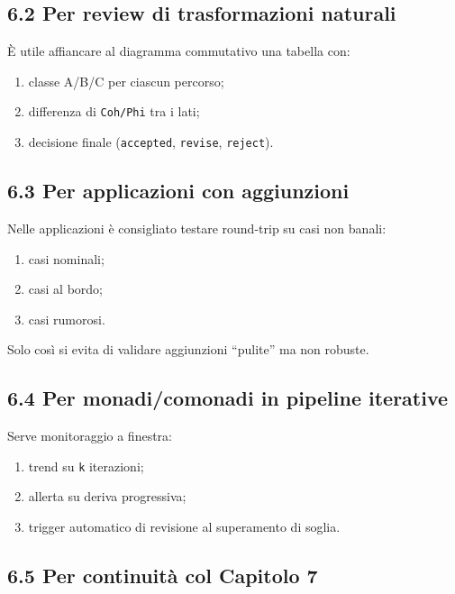 \subsection{6.2 Per review di trasformazioni naturali}

È utile affiancare al diagramma commutativo una tabella con:

\begin{enumerate}
\def\labelenumi{\arabic{enumi}.}
\tightlist
\item
  classe A/B/C per ciascun percorso;
\item
  differenza di \texttt{Coh/Phi} tra i lati;
\item
  decisione finale (\texttt{accepted}, \texttt{revise}, \texttt{reject}).
\end{enumerate}

\subsection{6.3 Per applicazioni con aggiunzioni}

Nelle applicazioni è consigliato testare round-trip su casi non banali:

\begin{enumerate}
\def\labelenumi{\arabic{enumi}.}
\tightlist
\item
  casi nominali;
\item
  casi al bordo;
\item
  casi rumorosi.
\end{enumerate}

Solo così si evita di validare aggiunzioni ``pulite'' ma non robuste.

\subsection{6.4 Per monadi/comonadi in pipeline iterative}

Serve monitoraggio a finestra:

\begin{enumerate}
\def\labelenumi{\arabic{enumi}.}
\tightlist
\item
  trend su \texttt{k} iterazioni;
\item
  allerta su deriva progressiva;
\item
  trigger automatico di revisione al superamento di soglia.
\end{enumerate}

\subsection{6.5 Per continuità col Capitolo 7}

